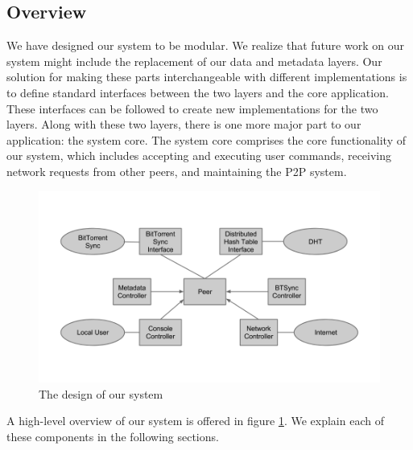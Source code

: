\documentclass[12pt]{report}
\begin{document}
\subsection{Overview} \label{subsec:Overview_sec:SystemDesign_chap:Implementation}
We have designed our system to be modular. We realize that future work on our system might include the replacement of our data and metadata layers. Our solution for making these parts interchangeable with different implementations is to define standard interfaces between the two layers and the core application. These interfaces can be followed to create new implementations for the two layers. Along with these two layers, there is one more major part to our application: the system core. The system core comprises the core functionality of our system, which includes accepting and executing user commands, receiving network requests from other peers, and maintaining the P2P system.

\begin{figure} \label{fig:SystemDesign}
  \centering
  \includegraphics[scale=0.4]{SystemDesign}
  \caption{The design of our system}
\end{figure}

A high-level overview of our system is offered in figure \ref{fig:SystemDesign}. We explain each of these components in the following sections.
\end{document}
